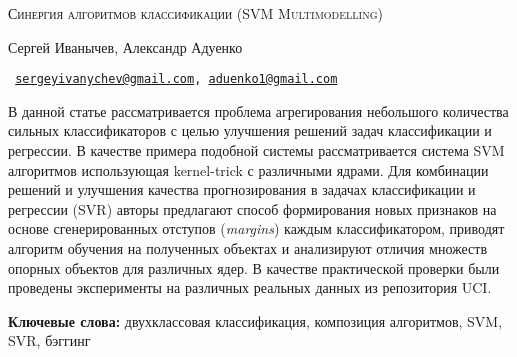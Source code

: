 \documentclass[a4paper, 10pt]{article}
\begin{document}
\begin{center}
    \vspace{2.6cm}
    \textsc{\LARGE Синергия алгоритмов классификации (SVM Multimodelling)}
    \vspace{0.6cm}

    { Сергей Иванычев, Александр Адуенко}

\texttt{\small
    \href{mailto:sergeyivanychev@gmail.com}{sergeyivanychev@gmail.com},  \href{mailto:aduenko1@gmail.com}{aduenko1@gmail.com}
}
    \vspace{0.6cm}
    \end{center}
    \noindent\makebox[\linewidth]{\rule{\textwidth}{0.4pt}}

    {\textbf{}\small В данной статье рассматривается проблема агрегирования небольшого количества сильных классификаторов с целью улучшения решений задач классификации и регрессии.  В качестве примера подобной системы рассматривается система SVM  алгоритмов использующая kernel-trick с различными ядрами. Для комбинации решений и улучшения качества прогнозирования в задачах классификации и регрессии (SVR) авторы предлагают способ формирования новых признаков на основе сгенерированных отступов (\emph{margins}) каждым классификатором, приводят алгоритм обучения на полученных объектах и анализируют отличия множеств опорных объектов для различных ядер. В качестве практической проверки были проведены эксперименты на различных реальных данных из репозитория UCI.

    \textbf{Ключевые слова:} двухклассовая классификация, композиция алгоритмов, SVM, SVR, бэггинг}
    
        \noindent\makebox[\linewidth]{\rule{\textwidth}{0.4pt}}

    \vspace{1cm}
    
\end{document}
